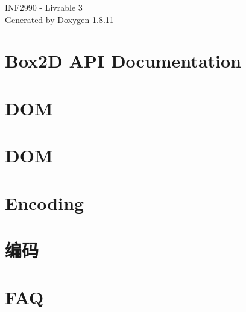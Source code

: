 \documentclass[twoside]{book}
\newcommand{\+}{\discretionary{\mbox{\scriptsize$\hookleftarrow$}}{}{}}
\newcommand{\clearemptydoublepage}{%
  \newpage{\pagestyle{empty}\cleardoublepage}%
}
\begin{document}
\hypersetup{pageanchor=false,
             bookmarksnumbered=true,
             pdfencoding=unicode
            }
\begin{titlepage}
\vspace*{7cm}
\begin{center}%
{\Large I\+N\+F2990 -\/ Livrable 3 }\\
\vspace*{1cm}
{\large Generated by Doxygen 1.8.11}\\
\end{center}
\end{titlepage}
\clearemptydoublepage
\tableofcontents
\clearemptydoublepage
{}
\hypersetup{pageanchor=true}

\chapter{Box2D A\+PI Documentation}
\label{index}\hypertarget{index}{}
\chapter{D\+OM}
\label{md_Cadriciel_Commun_Externe_RapidJSON_doc_dom}
\hypertarget{md_Cadriciel_Commun_Externe_RapidJSON_doc_dom}{}

\chapter{D\+OM}
\label{md_Cadriciel_Commun_Externe_RapidJSON_doc_dom.zh-cn}
\hypertarget{md_Cadriciel_Commun_Externe_RapidJSON_doc_dom.zh-cn}{}

\chapter{Encoding}
\label{md_Cadriciel_Commun_Externe_RapidJSON_doc_encoding}
\hypertarget{md_Cadriciel_Commun_Externe_RapidJSON_doc_encoding}{}

\chapter{编码}
\label{md_Cadriciel_Commun_Externe_RapidJSON_doc_encoding.zh-cn}
\hypertarget{md_Cadriciel_Commun_Externe_RapidJSON_doc_encoding.zh-cn}{}

\chapter{F\+AQ}
\label{md_Cadriciel_Commun_Externe_RapidJSON_doc_faq}
\hypertarget{md_Cadriciel_Commun_Externe_RapidJSON_doc_faq}{}

\end{document}
